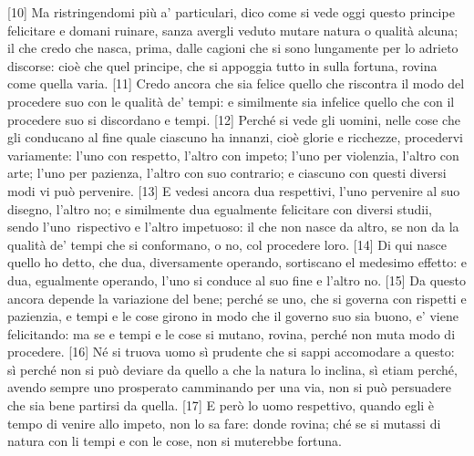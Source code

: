 {[}10{]} Ma ristringendomi più a' particulari, dico come si vede oggi
questo principe felicitare e domani ruinare, sanza avergli veduto mutare
natura o qualità alcuna; il che credo che nasca, prima, dalle cagioni
che si sono lungamente per lo adrieto discorse: cioè che quel principe,
che si appoggia tutto in sulla fortuna, rovina come quella varia.
{[}11{]} Credo ancora che sia felice quello che riscontra il modo del procedere suo con le qualità de' tempi: e similmente sia infelice quello che con il procedere suo si discordano e tempi. {[}12{]} Perché si vede gli uomini, nelle cose che gli conducano al fine quale ciascuno ha innanzi, cioè glorie e ricchezze, procedervi variamente: l'uno con respetto, l'altro con impeto; l'uno per violenzia, l'altro con arte; l'uno per pazienza, l'altro con suo contrario; e ciascuno con questi diversi modi vi può pervenire.
{[}13{]} E vedesi ancora dua respettivi, l'uno pervenire al suo disegno, l'altro no; e similmente dua egualmente felicitare con diversi studii, sendo l'uno\est\ rispectivo e l'altro impetuoso: il che non nasce da altro, se non da la qualità de' tempi che si conformano, o no, col procedere loro. {[}14{]} Di qui nasce quello ho detto, che dua, diversamente operando, sortiscano el medesimo effetto: e dua, egualmente operando, l'uno si conduce al suo fine e l'altro no. {[}15{]} Da questo ancora depende la variazione del bene; perché se uno, che si governa con rispetti e pazienzia, e tempi e le cose girono in modo che il governo suo sia buono, e' viene felicitando: ma se e tempi e le cose si mutano, rovina, perché non muta modo di procedere. {[}16{]} Né si truova uomo sì prudente che si sappi accomodare a questo: sì perché non si può deviare da quello a che la natura lo inclina, sì etiam perché, avendo sempre uno prosperato camminando per una via, non si può persuadere che sia bene partirsi da quella. {[}17{]} E però lo uomo respettivo, quando egli è tempo di venire allo impeto, non lo sa fare: donde rovina; ché se si mutassi di natura con li tempi e con le cose, non si muterebbe fortuna.

